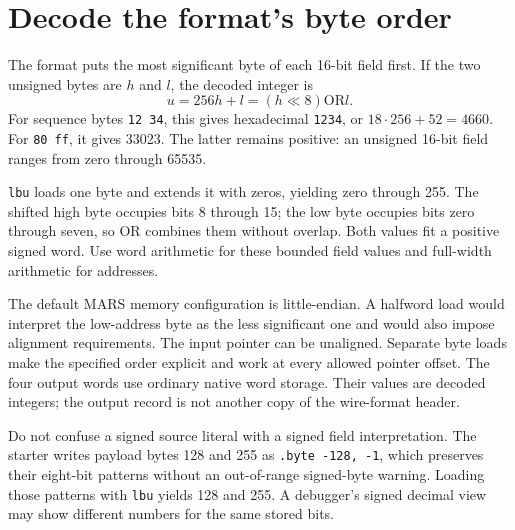 \section{Decode the format's byte order}
The format puts the most significant byte of each 16-bit field first. If the two
unsigned bytes are \(h\) and \(l\), the decoded integer is
\[
  u=256h+l=(h\ll8)\mathbin{\mathrm{OR}}l.
\]
For sequence bytes \texttt{12 34}, this gives hexadecimal \texttt{1234}, or
\(18\cdot256+52=4660\). For \texttt{80 ff}, it gives 33023. The latter remains
positive: an unsigned 16-bit field ranges from zero through 65535.

\texttt{lbu} loads one byte and extends it with zeros, yielding zero through 255.
The shifted high byte occupies bits 8 through 15; the low byte occupies bits zero
through seven, so OR combines them without overlap. Both values fit a positive
signed word. Use word arithmetic for these bounded field values and full-width
arithmetic for addresses.

The default MARS memory configuration is little-endian. A halfword load would
interpret the low-address byte as the less significant one and would also impose
alignment requirements. The input pointer can be unaligned. Separate byte loads
make the specified order explicit and work at every allowed pointer offset. The
four output words use ordinary native word storage. Their values are decoded
integers; the output record is not another copy of the wire-format header.

Do not confuse a signed source literal with a signed field interpretation. The
starter writes payload bytes 128 and 255 as \texttt{.byte -128, -1}, which preserves
their eight-bit patterns without an out-of-range signed-byte warning. Loading those
patterns with \texttt{lbu} yields 128 and 255. A debugger's signed decimal view may
show different numbers for the same stored bits.
